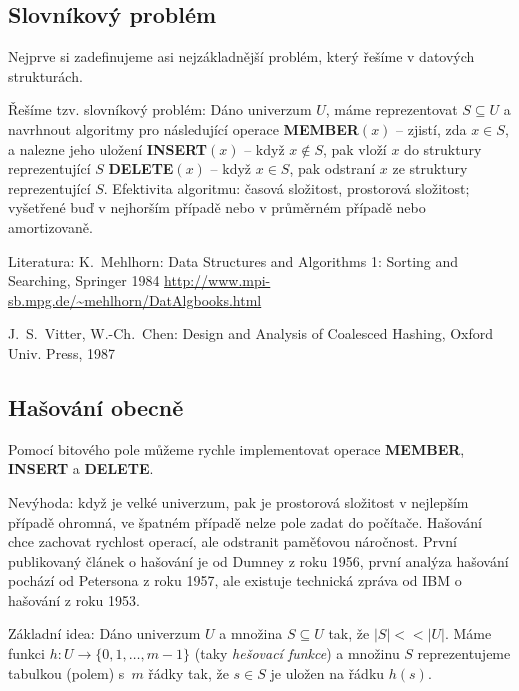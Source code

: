 \documentclass[a4paper,12pt]{article}
\begin{document}
\subsection{Slovníkový problém}

Nejprve si zadefinujeme asi 
nejzákladnější problém, který řešíme v datových strukturách. 

Řešíme tzv. slovníkový problém: Dáno 
univerzum $U$, máme reprezentovat $S\subseteq U$ a navrhnout algoritmy pro 
násle\-dující operace\newline 
{\bf MEMBER$(x)$} -- zjistí, zda $x\in S$, a nalezne jeho 
uložení\newline 
{\bf INSERT$(x)$} -- když $x\notin S$, pak vloží $x$ do struktury 
repre\-zentující $S$\newline 
{\bf DELETE$(x)$} -- když $x\in S$, pak odstraní $x$ ze struktury 
reprezentující $S$.\newline 
Efektivita algoritmu: časová složitost, prostorová 
složitost;\newline 
vy\-šetřené buď v nejhorším případě nebo v 
průměrném případě nebo amortizovaně.

Literatura:\newline 
K.~Mehlhorn: Data Structures and Algorithms 1: Sorting 
and Searching, Springer 1984\newline 
\url{http://www.mpi-sb.mpg.de/~mehlhorn/DatAlgbooks.html}

J.~S.~Vitter, W.-Ch.~Chen: Design and Analysis of 
Coalesced Hashing, Oxford Univ. Press, 1987

\subsection{Hašování obecně}

Pomocí bitového pole můžeme rychle 
implementovat operace {\bf MEMBER}, {\bf INSERT} a {\bf DELETE}. 

Nevýhoda: když je velké univerzum, pak je prostorová 
složitost v nejlepším případě ohrom\-ná, ve špatném 
případě nelze pole zadat do počítače.\newline 
Hašování chce zachovat rychlost operací, ale odstranit 
paměťo\-vou náročnost. První publikovaný článek o 
hašování je od Dumney z roku 1956, první analýza hašování 
pochází od Petersona z roku 1957, ale existuje technická  
zpráva od IBM o hašování z roku 1953.

Základní idea: Dáno univerzum $U$ a množina 
$S\subseteq U$ tak, že $|S|<<|U|$. Máme funkci 
$h:U\to \{0,1,\dots,m-1\}$ (taky \emph{hešovací funkce}) a množinu $S$ reprezentujeme 
tabulkou (polem) s~$m$ řádky tak, že $s\in S$ je uložen na 
řádku $h(s)$. 
\end{document}
